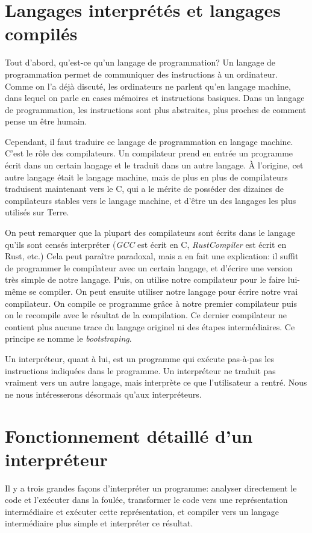 \documentclass{article}
\begin{document}
\section{Langages interprétés et langages compilés}
Tout d’abord, qu’est-ce qu’un langage de programmation\nobreakspace?
Un langage de programmation permet de communiquer des instructions à un ordinateur.
Comme on l’a déjà discuté, les ordinateurs ne parlent qu’en langage machine, dans lequel
on parle en cases mémoires et instructions basiques. Dans un langage de programmation,
les instructions sont plus abstraites, plus proches de comment pense un être humain. \cite[p. 55]{berry}

Cependant, il faut traduire ce langage de programmation en langage machine. C’est le rôle
des compilateurs. Un compilateur prend en entrée un programme écrit dans un certain langage
et le traduit dans un autre langage. \cite{github-programming-languages}
À l’origine, cet autre langage était le langage machine,
mais de plus en plus de compilateurs traduisent maintenant vers le C, qui a le mérite de posséder
des dizaines de compilateurs stables vers le langage machine, et d’être un des langages les
plus utilisés sur Terre.

On peut remarquer que la plupart des compilateurs sont écrits dans le
langage qu’ils sont censés interpréter (\textit{GCC} est écrit en C, \textit{RustCompiler}
est écrit en Rust, etc.)
Cela peut paraître paradoxal, mais a en fait une explication\nobreakspace: il suffit de programmer
le compilateur avec un certain langage, et d’écrire une version très simple de notre langage.
Puis, on utilise notre compilateur pour le faire lui-même se compiler. On peut ensuite utiliser notre
langage pour écrire notre vrai compilateur. On compile ce programme grâce à notre premier compilateur
puis on le recompile avec le résultat de la compilation. Ce dernier compilateur ne contient plus
aucune trace du langage originel ni des étapes intermédiaires. Ce principe se nomme le
\textit{bootstraping}. \cite[p. 448]{berry}

Un interpréteur, quant à lui, est un programme qui exécute pas-à-pas les instructions indiquées
dans le programme. Un interpréteur ne traduit pas vraiment vers un autre langage, mais interprète
ce que l’utilisateur a rentré. \cite{github-programming-languages}
Nous ne nous intéresserons désormais qu’aux interpréteurs.

\section{Fonctionnement détaillé d’un interpréteur}
Il y a trois grandes façons d’interpréter un programme\nobreakspace: analyser directement le code
et l’exécuter dans la foulée, transformer le code vers une représentation intermédiaire et exécuter
cette représentation, et compiler vers un langage intermédiaire plus simple et interpréter ce
résultat. \cite{wikipedia-interpreter}
\end{document}

